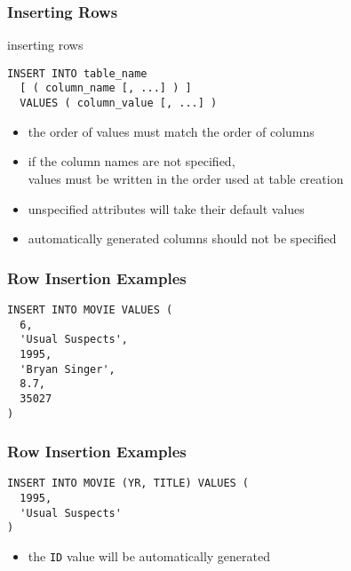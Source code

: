 \documentclass[dvipsnames]{beamer}
\theoremstyle{plain}
\begin{document}
\begin{frame}[fragile]
  \frametitle{Inserting Rows}

  \begin{block}{inserting rows}
    \begin{lstlisting}
INSERT INTO table_name
  [ ( column_name [, ...] ) ]
  VALUES ( column_value [, ...] )
    \end{lstlisting}
  \end{block}

  \pause
  \begin{itemize}
    \item the order of values must match the order of columns
    \item if the column names are not specified,\\
      values must be written in the order used at table creation
    \item unspecified attributes will take their default values

    \pause
    \medskip
    \item automatically generated columns should not be specified
  \end{itemize}
\end{frame}

\begin{frame}[fragile]
  \frametitle{Row Insertion Examples}

  \begin{example}
    \begin{lstlisting}
INSERT INTO MOVIE VALUES (
  6,
  'Usual Suspects',
  1995,
  'Bryan Singer',
  8.7,
  35027
)
    \end{lstlisting}
  \end{example}
\end{frame}

\begin{frame}[fragile]
  \frametitle{Row Insertion Examples}

  \begin{example}
    \begin{lstlisting}
INSERT INTO MOVIE (YR, TITLE) VALUES (
  1995,
  'Usual Suspects'
)
    \end{lstlisting}

    \pause
    \begin{itemize}
      \item the \texttt{ID} value will be automatically generated
    \end{itemize}
  \end{example}
\end{frame}
\end{document}
